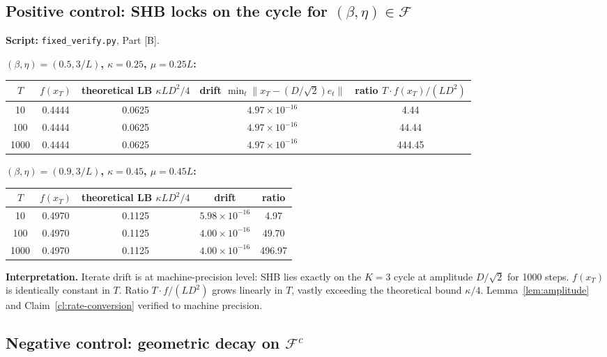 \documentclass[11pt]{article}
\theoremstyle{definition}
\theoremstyle{remark}
\begin{document}
\subsection{Positive control: SHB locks on the cycle for \texorpdfstring{$(\beta,\eta) \in \mathcal{F}$}{(beta,eta) in F}}

\textbf{Script:} \texttt{fixed\_verify.py}, Part [B].

\textbf{$(\beta,\eta) = (0.5, 3/L)$, $\kappa = 0.25$, $\mu = 0.25 L$:}

\begin{center}
\small
\begin{tabular}{ccccc}
\toprule
$T$ & $f(x_T)$ & theoretical LB $\kappa L D^2/4$ & drift $\min_t \|x_T - (D/\sqrt 2) e_t\|$ & ratio $T \cdot f(x_T)/(LD^2)$ \\
\midrule
10   & 0.4444 & 0.0625 & $4.97 \times 10^{-16}$ & 4.44 \\
100  & 0.4444 & 0.0625 & $4.97 \times 10^{-16}$ & 44.44 \\
1000 & 0.4444 & 0.0625 & $4.97 \times 10^{-16}$ & 444.45 \\
\bottomrule
\end{tabular}
\end{center}

\textbf{$(\beta,\eta) = (0.9, 3/L)$, $\kappa = 0.45$, $\mu = 0.45 L$:}

\begin{center}
\small
\begin{tabular}{ccccc}
\toprule
$T$ & $f(x_T)$ & theoretical LB $\kappa L D^2/4$ & drift & ratio \\
\midrule
10   & 0.4970 & 0.1125 & $5.98 \times 10^{-16}$ & 4.97 \\
100  & 0.4970 & 0.1125 & $4.00 \times 10^{-16}$ & 49.70 \\
1000 & 0.4970 & 0.1125 & $4.00 \times 10^{-16}$ & 496.97 \\
\bottomrule
\end{tabular}
\end{center}

\textbf{Interpretation.} Iterate drift is at machine-precision level: SHB lies exactly on the $K=3$ cycle at amplitude $D/\sqrt 2$ for 1000 steps. $f(x_T)$ is identically constant in $T$. Ratio $T\cdot f/(LD^2)$ grows linearly in $T$, vastly exceeding the theoretical bound $\kappa/4$. Lemma~\ref{lem:amplitude} and Claim~\ref{cl:rate-conversion} verified to machine precision.

\subsection{Negative control: geometric decay on \texorpdfstring{$\mathcal{F}^c$}{Fc}}
\label{sec:negative-control}
\end{document}
